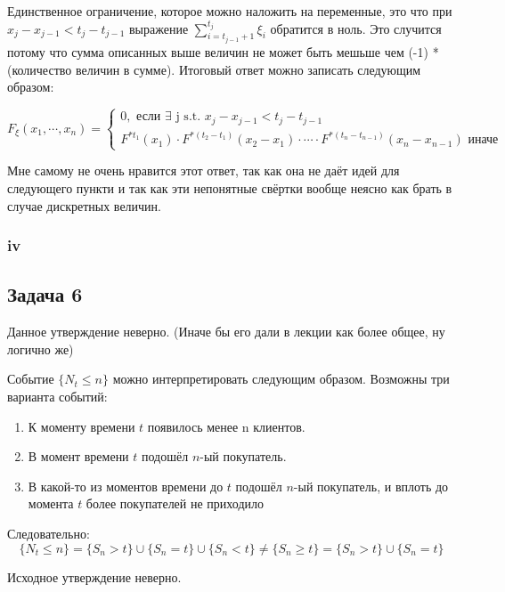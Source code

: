 \documentclass[a4paper,12pt]{article}
\begin{document}
Единственное ограничение, которое можно наложить на переменные, это что при  $ x_j - x_{j-1}  < t_j - t_{j-1}$ выражение $ \sum_{i = t_{j-1} + 1}^{t_j}\xi_i $ обратится в ноль. Это случится потому что сумма описанных выше величин не может быть мешьше чем (-1) * (количество величин в сумме). Итоговый ответ можно записать следующим образом:

$ F_\xi(x_1, \cdots, x_n) =
\begin{cases}
	0, \text{ если } \exists \text{ j s.t. } x_j - x_{j-1}  < t_j - t_{j-1} \\
 F^{*t_1}(x_1) \cdot F^{*(t_2 - t_1)}(x_2 - x_1) \cdot \cdots \cdot F^{*(t_n - t_{n-1})}(x_n - x_{n-1}) \text{ иначе }
\end{cases}
$

Мне самому не очень нравится этот ответ, так как она не даёт идей для следующего пункти и так как эти непонятные свёртки вообще неясно как брать в случае дискретных величин. 


\subsubsection{iv}

\subsection{Задача 6}

Данное утверждение неверно. (Иначе бы его дали в лекции как более общее, ну логично же)

Событие $ \{N_t \le n\}$ можно интерпретировать следующим образом. Возможны три варианта событий:

\begin{enumerate}[\Sun]
	\item	К моменту времени $ t $ появилось менее n клиентов. 
	
	\item В момент времени $ t $ подошёл $ n $-ый покупатель.
	
	\item В какой-то из моментов времени до $ t $ подошёл $ n $-ый покупатель, и вплоть до момента $ t $ более покупателей не приходило
\end{enumerate}

Следовательно:
\[  \{N_t \le n\} = \{S_n > t\} \cup \{S_n = t\} \cup \{S_n < t\} \neq \{S_n \ge t \} =  \{S_n > t\} \cup \{S_n = t\}  \]

Исходное утверждение неверно.
\end{document}
